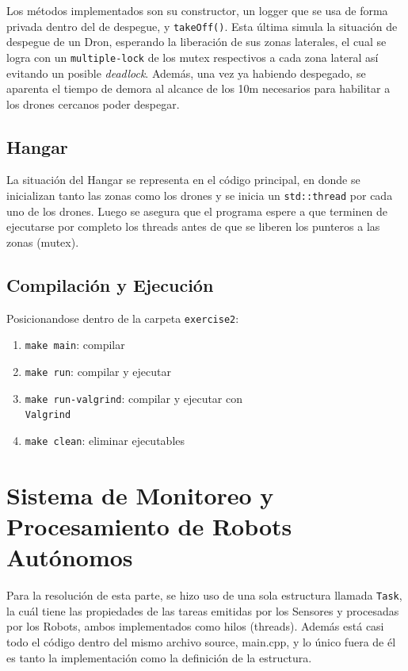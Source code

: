 \documentclass[11pt, a4paper]{article}
\begin{document}
\begin{multicols}{2}
Los métodos implementados son su constructor, un logger que se usa de forma privada dentro del de despegue, y \lstinline|takeOff()|. Esta última simula la situación de despegue de un Dron, esperando la liberación de sus zonas laterales, el cual se logra con un \lstinline|multiple-lock| de los mutex respectivos a cada zona lateral así evitando un posible \textit{deadlock}. Además, una vez ya habiendo despegado, se aparenta el tiempo de demora al alcance de los 10m necesarios para habilitar a los drones cercanos poder despegar.

\subsection{Hangar}

La situación del Hangar se representa en el código principal, en donde se inicializan tanto las zonas como los drones y se inicia un \lstinline|std::thread| por cada uno de los drones. Luego se asegura que el programa espere a que terminen de ejecutarse por completo los threads antes de que se liberen los punteros a las zonas (mutex).

\columnbreak

\subsection{Compilación y Ejecución}

Posicionandose dentro de la carpeta \lstinline|exercise2|:

\begin{enumerate}[label=\roman*.]
    \item \lstinline|make main|: compilar
    \item \lstinline|make run|: compilar y ejecutar
    \item \lstinline|make run-valgrind|: compilar y ejecutar con \\ \lstinline|Valgrind|
    \item \lstinline|make clean|: eliminar ejecutables
\end{enumerate}

\section{Sistema de Monitoreo y Procesamiento de Robots Autónomos}

Para la resolución de esta parte, se hizo uso de una sola estructura llamada \lstinline|Task|, la cuál tiene las propiedades de las tareas emitidas por los Sensores y procesadas por los Robots, ambos implementados como hilos (threads). Además está casi todo el código dentro del mismo archivo source, main.cpp, y lo único fuera de él es tanto la implementación como la definición de la estructura.


\end{multicols}
\end{document}
